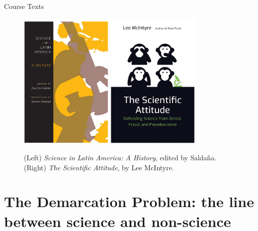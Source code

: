 \documentclass{beamer}
\begin{document}
\begin{frame}{Course Texts}
\begin{figure}
\centering
\includegraphics[width=0.4\textwidth]{figures/book1.png}
\includegraphics[width=0.4\textwidth]{figures/book2.png}
\caption{\label{fig:1} (Left) \textit{Science in Latin America: A History}, edited by Salda\~{n}a. (Right) \textit{The Scientific Attitude}, by Lee McIntyre.}
\end{figure}
\end{frame}

\section{The Demarcation Problem: the line between science and non-science}
\end{document}
